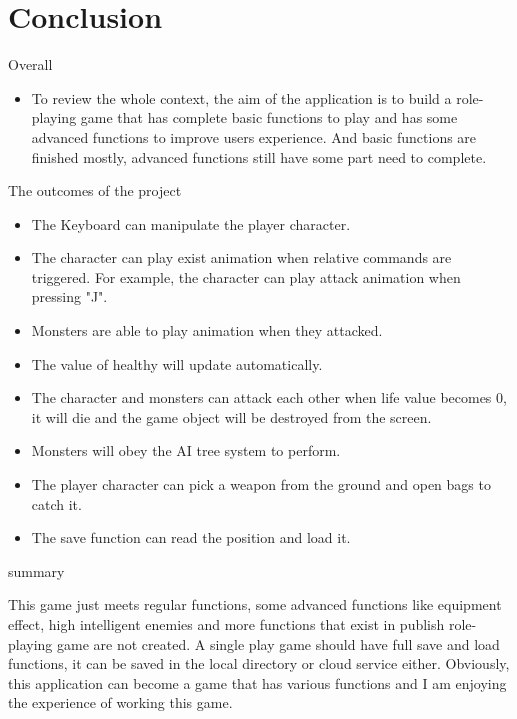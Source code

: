 \chapter{Conclusion}
Overall
\begin{itemize}
\item To review the whole context, the aim of the application is to build a role-playing game that has complete basic functions to play and has some advanced functions to improve users experience. And basic functions are finished mostly, advanced functions still have some part need to complete.
\end{itemize}
The outcomes of the project
\begin{itemize}
\item The Keyboard can manipulate the player character.
\item The character can play exist animation when relative commands are triggered. For example, the character can play attack animation when pressing "J".
\item Monsters are able to play animation when they attacked.
\item The value of healthy will update automatically. 
\item The character and monsters can attack each other when life value becomes 0, it will die and the game object will be destroyed from the screen. 
\item Monsters will obey the AI tree system to perform. 
\item The player character can pick a weapon from the ground and open bags to catch it.
\item The save function can read the position and load it.
\end{itemize}
summary
\begin{itemize}
This game just meets regular functions, some advanced functions like equipment effect, high intelligent enemies and more functions that exist in publish role-playing game are not created. A single play game should have full save and load functions, it can be saved in the local directory or cloud service either. 
Obviously, this application can become a game that has various functions and I am enjoying the experience of working this game.
\end{itemize}